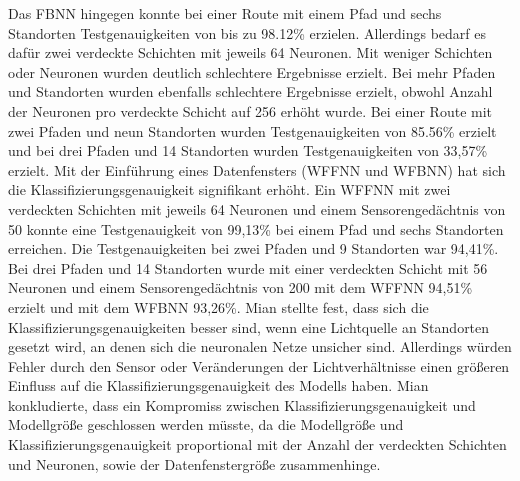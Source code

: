 \newline
Das FBNN hingegen konnte bei einer Route mit einem Pfad und sechs Standorten Testgenauigkeiten von bis zu 98.12\% erzielen.
Allerdings bedarf es dafür zwei verdeckte Schichten mit jeweils 64 Neuronen.
Mit weniger Schichten oder Neuronen wurden deutlich schlechtere Ergebnisse erzielt.
Bei mehr Pfaden und Standorten wurden ebenfalls schlechtere Ergebnisse erzielt, obwohl Anzahl der Neuronen pro verdeckte Schicht auf 256 erhöht wurde.
Bei einer Route mit zwei Pfaden und neun Standorten wurden Testgenauigkeiten von 85.56\% erzielt und
bei drei Pfaden und 14 Standorten wurden Testgenauigkeiten von 33,57\% erzielt.
\newline
\newline
Mit der Einführung eines Datenfensters (WFFNN und WFBNN) hat sich die Klassifizierungsgenauigkeit signifikant erhöht.
Ein WFFNN mit zwei verdeckten Schichten mit jeweils 64 Neuronen und einem Sensorengedächtnis von 50 konnte eine Testgenauigkeit von 99,13\%
bei einem Pfad und sechs Standorten erreichen.
Die Testgenauigkeiten bei zwei Pfaden und 9 Standorten war 94,41\%.
Bei drei Pfaden und 14 Standorten wurde mit einer verdeckten Schicht mit 56 Neuronen und einem Sensorengedächtnis von 200 mit dem WFFNN 94,51\% erzielt
und mit dem WFBNN 93,26\%.
\newline
\newline
Mian stellte fest, dass sich die Klassifizierungsgenauigkeiten besser sind,
wenn eine Lichtquelle an Standorten gesetzt wird, an denen sich die neuronalen Netze unsicher sind.
Allerdings würden Fehler durch den Sensor oder Veränderungen der Lichtverhältnisse
einen größeren Einfluss auf die Klassifizierungsgenauigkeit des Modells haben.
\newline
\newline
Mian konkludierte, dass ein Kompromiss zwischen Klassifizierungsgenauigkeit und Modellgröße geschlossen werden müsste,
da die Modellgröße und Klassifizierungsgenauigkeit proportional mit der Anzahl der verdeckten Schichten und Neuronen,
sowie der Datenfenstergröße zusammenhinge.
